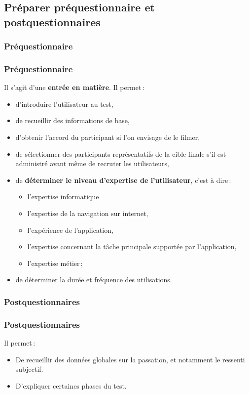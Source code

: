 				
				
					   
					
		
		
	\subsection{Préparer préquestionnaire et postquestionnaires} 
		
		\subsubsection{Préquestionnaire}
		\begin{frame}[allowframebreaks]
		\frametitle{Préquestionnaire \citep{ergolab2014a}}
			Il s'agit d'une \textbf{entrée en matière}. Il permet\,:
			\begin {itemize}
				      \item d'introduire l'utilisateur au test,
				      \item de recueillir des informations de base, 
				      \item d'obtenir l'accord du participant si l'on envisage de le filmer,
				      \item de sélectionner des participants représentatifs de la cible finale s'il est administré avant même de recruter les utilisateurs,
				      \framebreak
				      \item de \textbf{déterminer le niveau d'expertise de l'utilisateur}, c'est à dire\,:
				      \begin {itemize}
				      \item l'expertise informatique
				      \item l'expertise de la navigation sur internet, 
				      \item l'expérience de l'application, 
				      \item l'expertise concernant la tâche principale supportée par l'application,
				      \item l'expertise métier\,;
				      \end{itemize}
				      \item de déterminer la durée et fréquence des utilisations.


			\end{itemize}
		\end{frame}
		
		\subsubsection{Postquestionnaires}
		\begin{frame}[allowframebreaks]
		\frametitle{Postquestionnaires \citep{ergolab2014a}}
			Il permet\,:
			\begin {itemize}
				      \item De recueillir des données globales sur la passation, et notamment le ressenti subjectif. 
				      \item D'expliquer certaines phases du test. 
			\end{itemize}
		\end{frame}
		
